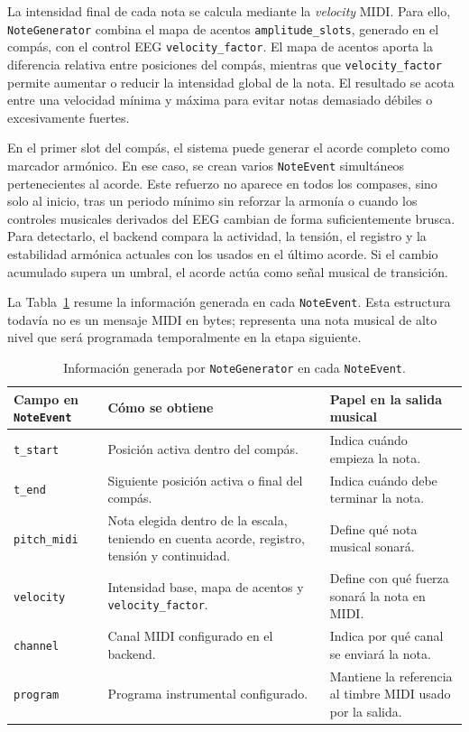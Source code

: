\documentclass[../main.tex]{subfiles}
\begin{document}
La intensidad final de cada nota se calcula mediante la \textit{velocity} MIDI. Para ello, \texttt{NoteGenerator} combina el mapa de acentos \texttt{amplitude\_slots}, generado en el compás, con el control EEG \texttt{velocity\_factor}. El mapa de acentos aporta la diferencia relativa entre posiciones del compás, mientras que \texttt{velocity\_factor} permite aumentar o reducir la intensidad global de la nota. El resultado se acota entre una velocidad mínima y máxima para evitar notas demasiado débiles o excesivamente fuertes.

En el primer slot del compás, el sistema puede generar el acorde completo como marcador armónico. En ese caso, se crean varios \texttt{NoteEvent} simultáneos pertenecientes al acorde. Este refuerzo no aparece en todos los compases, sino solo al inicio, tras un periodo mínimo sin reforzar la armonía o cuando los controles musicales derivados del EEG cambian de forma suficientemente brusca. Para detectarlo, el backend compara la actividad, la tensión, el registro y la estabilidad armónica actuales con los usados en el último acorde. Si el cambio acumulado supera un umbral, el acorde actúa como señal musical de transición.

La Tabla~\ref{tab:impl_note_generator_noteevent} resume la información generada en cada \texttt{NoteEvent}. Esta estructura todavía no es un mensaje MIDI en bytes; representa una nota musical de alto nivel que será programada temporalmente en la etapa siguiente.

\begin{table}[H]
    \centering
    \caption{Información generada por \texttt{NoteGenerator} en cada \texttt{NoteEvent}.}
    \label{tab:impl_note_generator_noteevent}
    \footnotesize
    \setlength{\tabcolsep}{3pt}
    \renewcommand{\arraystretch}{1.10}
    \begin{tabular}{p{}p{}p{}}
        \hline
        \textbf{Campo en \texttt{NoteEvent}} & \textbf{Cómo se obtiene} & \textbf{Papel en la salida musical} \\
        \hline
        \texttt{t\_start} &
        Posición activa dentro del compás. &
        Indica cuándo empieza la nota. \\
        \texttt{t\_end} &
        Siguiente posición activa o final del compás. &
        Indica cuándo debe terminar la nota. \\
        \texttt{pitch\_midi} &
        Nota elegida dentro de la escala, teniendo en cuenta acorde, registro, tensión y continuidad. &
        Define qué nota musical sonará. \\
        \texttt{velocity} &
        Intensidad base, mapa de acentos y \texttt{velocity\_factor}. &
        Define con qué fuerza sonará la nota en MIDI. \\
        \texttt{channel} &
        Canal MIDI configurado en el backend. &
        Indica por qué canal se enviará la nota. \\
        \texttt{program} &
        Programa instrumental configurado. &
        Mantiene la referencia al timbre MIDI usado por la salida. \\
        \hline
    \end{tabular}
\end{table}
\end{document}
